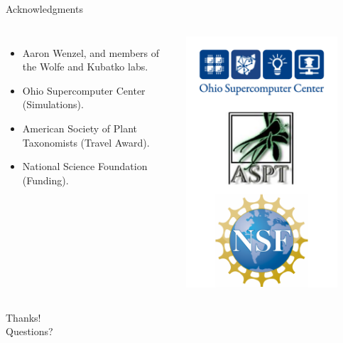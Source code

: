 \documentclass[presentation]{beamer}
\begin{document}
\begin{frame}[t,plain]{Acknowledgments}
	\begin{columns}[onlytextwidth]
	\begin{itemize}
		\item Aaron Wenzel, and members of the Wolfe and Kubatko labs.
		\item Ohio Supercomputer Center (Simulations).
		\item American Society of Plant Taxonomists (Travel Award).
		\item National Science Foundation (Funding).
	\end{itemize}
	
	\begin{center}
	\includegraphics[width=0.85\textwidth]{fig/logos}
	\end{center}
	\end{columns}
\end{frame}

\begin{frame}[c,plain]{}
	\begin{center}
		{\Huge Thanks!}\\
		\vspace{0.5in}
		{\LARGE Questions?}
	\end{center}
\end{frame}
\end{document}
